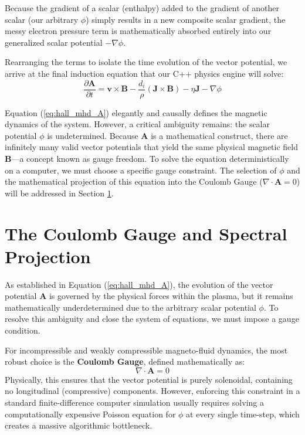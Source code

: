 \documentclass[11pt, a4paper]{article}
\begin{document}
Because the gradient of a scalar (enthalpy) added to the gradient of another scalar (our arbitrary $\phi$) simply results in a new composite scalar gradient, the messy electron pressure term is mathematically absorbed entirely into our generalized scalar potential $-\nabla \phi$. 

Rearranging the terms to isolate the time evolution of the vector potential, we arrive at the final induction equation that our C++ physics engine will solve:
\begin{equation}
    \frac{\partial \mathbf{A}}{\partial t} = \mathbf{v} \times \mathbf{B} - \frac{d_i}{\rho} (\mathbf{J} \times \mathbf{B}) - \eta \mathbf{J} - \nabla \phi
    \label{eq:hall_mhd_A}
\end{equation}

Equation (\ref{eq:hall_mhd_A}) elegantly and causally defines the magnetic dynamics of the system. However, a critical ambiguity remains: the scalar potential $\phi$ is undetermined. Because $\mathbf{A}$ is a mathematical construct, there are infinitely many valid vector potentials that yield the same physical magnetic field $\mathbf{B}$—a concept known as gauge freedom. To solve the equation deterministically on a computer, we must choose a specific gauge constraint. The selection of $\phi$ and the mathematical projection of this equation into the Coulomb Gauge ($\nabla \cdot \mathbf{A} = 0$) will be addressed in Section \ref{sec:gauge}.

\section{The Coulomb Gauge and Spectral Projection}
\label{sec:gauge}

As established in Equation (\ref{eq:hall_mhd_A}), the evolution of the vector potential $\mathbf{A}$ is governed by the physical forces within the plasma, but it remains mathematically underdetermined due to the arbitrary scalar potential $\phi$. To resolve this ambiguity and close the system of equations, we must impose a gauge condition. 

For incompressible and weakly compressible magneto-fluid dynamics, the most robust choice is the \textbf{Coulomb Gauge}, defined mathematically as:
\begin{equation}
    \nabla \cdot \mathbf{A} = 0
\end{equation}
Physically, this ensures that the vector potential is purely solenoidal, containing no longitudinal (compressive) components. However, enforcing this constraint in a standard finite-difference computer simulation usually requires solving a computationally expensive Poisson equation for $\phi$ at every single time-step, which creates a massive algorithmic bottleneck. 
\end{document}
